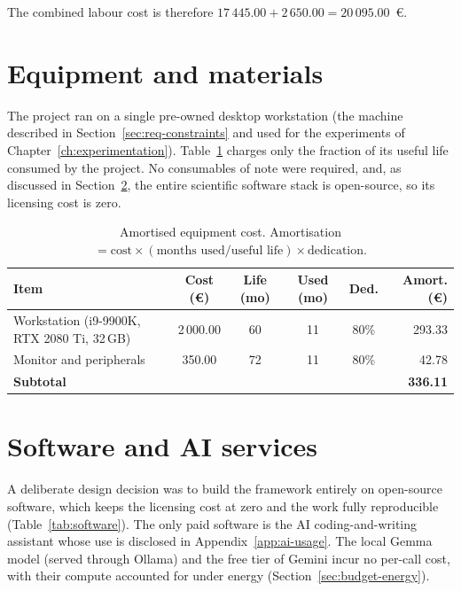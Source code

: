 The combined labour cost is therefore \(17\,445.00 + 2\,650.00 = 20\,095.00\)~€.

\section{Equipment and materials}\label{sec:budget-equipment}

The project ran on a single pre-owned desktop workstation (the machine described in
Section~\ref{sec:req-constraints} and used for the experiments of
Chapter~\ref{ch:experimentation}). Table~\ref{tab:equipment} charges only the fraction of its
useful life consumed by the project. No consumables of note were required, and, as discussed
in Section~\ref{sec:budget-software}, the entire scientific software stack is open-source, so
its licensing cost is zero.

\begin{table}[H]
  \centering
  \caption{Amortised equipment cost.
           Amortisation \(=\text{cost}\times(\text{months used}/\text{useful life})\times\text{dedication}\).}
  \label{tab:equipment}
  \small
  \begin{tabular}{@{}lccccr@{}}
    \toprule
    \textbf{Item} & \textbf{Cost (€)} & \textbf{Life (mo)} & \textbf{Used (mo)} & \textbf{Ded.} & \textbf{Amort. (€)} \\
    \midrule
    Workstation (i9-9900K, RTX 2080 Ti, 32\,GB) & 2\,000.00 & 60 & 11 & 80\% & 293.33 \\
    Monitor and peripherals                     & 350.00    & 72 & 11 & 80\% & 42.78 \\
    \midrule
    \textbf{Subtotal} & & & & & \textbf{336.11} \\
    \bottomrule
  \end{tabular}
\end{table}

\section{Software and AI services}\label{sec:budget-software}

A deliberate design decision was to build the framework entirely on open-source software, which
keeps the licensing cost at zero and the work fully reproducible (Table~\ref{tab:software}). The
only paid software is the AI coding-and-writing assistant whose use is disclosed in
Appendix~\ref{app:ai-usage}. The local Gemma model (served through Ollama) and the free tier of
Gemini incur no per-call cost, with their compute accounted for under energy
(Section~\ref{sec:budget-energy}).

